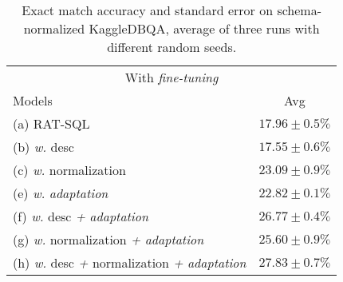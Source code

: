\documentclass[11pt,a4paper]{article}
\newcommand{\systemname}{\mbox{KaggleDBQA}\xspace}
\begin{document}
\begin{table}[b]
    \small
    \centering
    \caption{Exact match accuracy and standard error on schema-normalized \systemname, average of three runs with different random seeds.}
    \label{tab:normalized}
    \vspace{-0.5\baselineskip}
    \begin{tabular}{lc}
        \toprule
        \multicolumn{2}{c}{With  \textit{fine-tuning}} \\
        Models  & Avg  \\
        \midrule
        (a) RAT-SQL  &   $17.96  \pm 0.5\% $ \\
        (b) \quad \textit{w.} desc  &  $17.55  \pm 0.6\%$ \\
        (c) \quad \textit{w.} normalization  &  $23.09  \pm 0.9\%$\\
      
        (e) \quad \textit{w.} \textit{adaptation}   &  $22.82  \pm 0.1\%$ \\
        (f) \quad \textit{w.} desc \textit{+} \textit{adaptation}  & $26.77 \pm 0.4\%$\\
        (g) \quad \textit{w.} normalization \textit{+} \textit{adaptation}  & $25.60 \pm 0.9\%$ \\
        (h) \quad \textit{w.} desc \textit{+} normalization \textit{+} \textit{adaptation}  &  $27.83 \pm 0.7\%$ \\
        \bottomrule
    \end{tabular}
\end{table}
\end{document}
